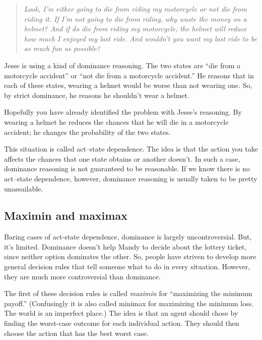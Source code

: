 \begin{quote}
\it Look, I'm either going to die from riding my motorcycle or not die from riding it.  If I'm not going to die from riding, why waste the money on a helmet?  And if do die from riding my motorcycle, the helmet will reduce how much I enjoyed my last ride. And wouldn't you want my last ride to be as much fun as possible?
\end{quote}

Jesse is using a kind of dominance reasoning.  The two states are ``die from a motorcycle accident'' or ``not die from a motorcycle accident.''  He reasons that in each of these states, wearing a helmet would be worse than not wearing one. So, by strict dominance, he reasons he shouldn't wear a helmet.
 
Hopefully you have already identified the problem with Jesse's reasoning. By wearing a helmet he reduces the chances that he will die in a motorcycle accident; he changes the probability of the two states.  

 This situation is called act--state dependence.  The idea is that the action you take affects the chances that one state obtains or another doesn't.  In such a case, dominance reasoning is not guaranteed to be reasonable.  If we know there is no act--state dependence, however, dominance reasoning is usually taken to be pretty unassailable.

\subsection{Maximin and maximax}

Baring cases of act-state dependence, dominance is largely uncontroversial.  But, it's limited.  Dominance doesn't help Mandy to decide about the lottery ticket, since neither option dominates the other.  So, people have striven to develop more general decision rules that tell someone what to do in every situation. However, they are much more controversial than dominance.  

The first of these decision rules is called {\it maximin} for ``maximizing the minimum payoff.'' (Confusingly it is also called minimax for maximizing the minimum loss.  The world is an imperfect place.)  The idea is that an agent should chose by finding the worst-case outcome for each individual action. They should then choose the action that has the best worst case.  

